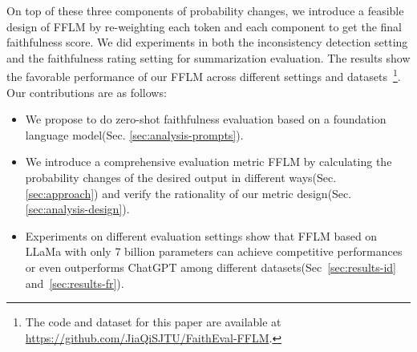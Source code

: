 On top of these three components of probability changes, we introduce a feasible design of FFLM by re-weighting each token and each component to get the final faithfulness score. We did experiments in both the inconsistency detection setting and the faithfulness rating setting for summarization evaluation. The results show the favorable performance of our FFLM across different settings and datasets~\footnote{The code and dataset for this paper are available at \url{https://github.com/JiaQiSJTU/FaithEval-FFLM}.}. Our contributions are as follows:



\begin{itemize}
\item We propose to do zero-shot faithfulness evaluation based on a  foundation language model(Sec. \ref{sec:analysis-prompts}).
\item We introduce a comprehensive evaluation metric FFLM by calculating the probability changes of the desired output in different ways(Sec. \ref{sec:approach}) and verify the rationality of our metric design(Sec.\ref{sec:analysis-design}).
\item Experiments on different evaluation settings show that FFLM based on LLaMa with only 7 billion parameters can achieve competitive performances or even outperforms ChatGPT among different datasets(Sec~\ref{sec:results-id} and~\ref{sec:results-fr}).

\end{itemize}

